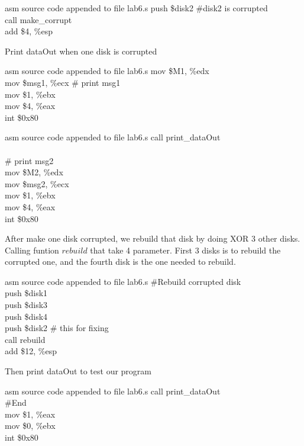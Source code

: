 \documentclass{article}
\begin{document}
\begin{multicols}{2}
\begin{GFT}{asm source code appended to file lab6.s}
\+push \$disk2 \#disk2 is corrupted\\
\+call make\_corrupt\\
\+add \$4, \%esp\\
\end{GFT}
Print dataOut when one disk is corrupted
\begin{GFT}{asm source code appended to file lab6.s}
\+mov \$M1, \%edx\\
\+mov \$msg1, \%ecx \# print msg1\\
\+mov \$1, \%ebx\\
\+mov \$4, \%eax\\
\+int \$0x80\\
\end{GFT}
\columnbreak
\begin{GFT}{asm source code appended to file lab6.s}
\+call print\_dataOut\\
\+\\
\+\# print msg2\\
\+mov \$M2, \%edx\\
\+mov \$msg2, \%ecx\\
\+mov \$1, \%ebx\\
\+mov \$4, \%eax\\
\+int \$0x80\\
\end{GFT}
\end{multicols}
\clearpage
After make one disk corrupted, we rebuild that disk by doing XOR 3 other disks. Calling funtion $rebuild$ that take 4 parameter. First 3 disks is to rebuild the corrupted one, and the fourth disk is the one needed to rebuild.
\begin{multicols}{2}
\begin{GFT}{asm source code appended to file lab6.s}
\+\#Rebuild corrupted disk\\
\+push \$disk1\\
\+push \$disk3\\
\+push \$disk4\\
\+push \$disk2	\# this for fixing\\
\+call rebuild\\
\+add \$12, \%esp\\
\end{GFT}
\columnbreak
Then print dataOut to test our program
\begin{GFT}{asm source code appended to file lab6.s}
\+call print\_dataOut\\
\+\#End \\
\+mov \$1, \%eax\\
\+mov \$0, \%ebx\\
\+int \$0x80\\
\end{GFT}
\end{multicols}
\end{document}
